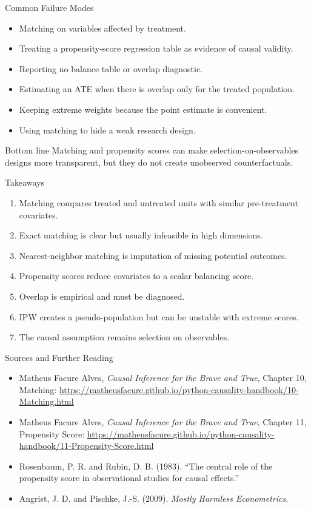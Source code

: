 \documentclass[11pt,aspectratio=169]{beamer}
\begin{document}
\begin{frame}{Common Failure Modes}
  \small
  \begin{itemize}
    \item Matching on variables affected by treatment.
    \item Treating a propensity-score regression table as evidence of causal validity.
    \item Reporting no balance table or overlap diagnostic.
    \item Estimating an ATE when there is overlap only for the treated population.
    \item Keeping extreme weights because the point estimate is convenient.
    \item Using matching to hide a weak research design.
  \end{itemize}
  \begin{block}{Bottom line}
    Matching and propensity scores can make selection-on-observables designs more transparent, but they do not create unobserved counterfactuals.
  \end{block}
\end{frame}

\begin{frame}{Takeaways}
  \begin{enumerate}
    \item Matching compares treated and untreated units with similar pre-treatment covariates.
    \item Exact matching is clear but usually infeasible in high dimensions.
    \item Nearest-neighbor matching is imputation of missing potential outcomes.
    \item Propensity scores reduce covariates to a scalar balancing score.
    \item Overlap is empirical and must be diagnosed.
    \item IPW creates a pseudo-population but can be unstable with extreme scores.
    \item The causal assumption remains selection on observables.
  \end{enumerate}
\end{frame}

\begin{frame}{Sources and Further Reading}
  \begin{itemize}
    \item Matheus Facure Alves, \emph{Causal Inference for the Brave and True}, Chapter 10, Matching:
      \url{https://matheusfacure.github.io/python-causality-handbook/10-Matching.html}
    \item Matheus Facure Alves, \emph{Causal Inference for the Brave and True}, Chapter 11, Propensity Score:
      \url{https://matheusfacure.github.io/python-causality-handbook/11-Propensity-Score.html}
    \item Rosenbaum, P. R. and Rubin, D. B. (1983). ``The central role of the propensity score in observational studies for causal effects.''
    \item Angrist, J. D. and Pischke, J.-S. (2009). \emph{Mostly Harmless Econometrics}.
  \end{itemize}
\end{frame}
\end{document}
